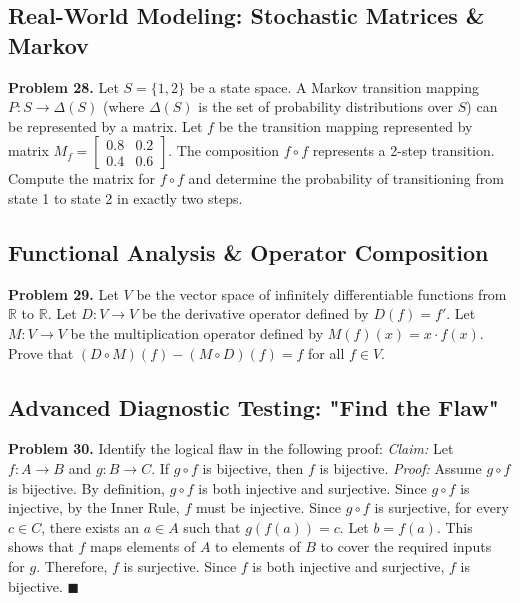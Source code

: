\documentclass[11pt, letterpaper]{article}
\theoremstyle{definition}
\theoremstyle{remark}
\newcommand{\R}{\mathbb{R}}
\begin{document}
\subsection{Real-World Modeling: Stochastic Matrices \& Markov}

\textbf{Problem 28.} Let $S = \{1, 2\}$ be a state space. A Markov transition mapping $P: S \to \Delta(S)$ (where $\Delta(S)$ is the set of probability distributions over $S$) can be represented by a matrix. Let $f$ be the transition mapping represented by matrix $M_f = \begin{bmatrix} 0.8 & 0.2 \\ 0.4 & 0.6 \end{bmatrix}$. The composition $f \circ f$ represents a 2-step transition. Compute the matrix for $f \circ f$ and determine the probability of transitioning from state 1 to state 2 in exactly two steps.

\subsection{Functional Analysis \& Operator Composition}

\textbf{Problem 29.} Let $V$ be the vector space of infinitely differentiable functions from $\R$ to $\R$. Let $D: V \to V$ be the derivative operator defined by $D(f) = f'$. Let $M: V \to V$ be the multiplication operator defined by $M(f)(x) = x \cdot f(x)$. Prove that $(D \circ M)(f) - (M \circ D)(f) = f$ for all $f \in V$.

\subsection{Advanced Diagnostic Testing: "Find the Flaw"}

\textbf{Problem 30.} Identify the logical flaw in the following proof:
\textit{Claim:} Let $f: A \to B$ and $g: B \to C$. If $g \circ f$ is bijective, then $f$ is bijective.
\textit{Proof:} Assume $g \circ f$ is bijective. By definition, $g \circ f$ is both injective and surjective. Since $g \circ f$ is injective, by the Inner Rule, $f$ must be injective. Since $g \circ f$ is surjective, for every $c \in C$, there exists an $a \in A$ such that $g(f(a)) = c$. Let $b = f(a)$. This shows that $f$ maps elements of $A$ to elements of $B$ to cover the required inputs for $g$. Therefore, $f$ is surjective. Since $f$ is both injective and surjective, $f$ is bijective. $\blacksquare$

\newpage
\end{document}

